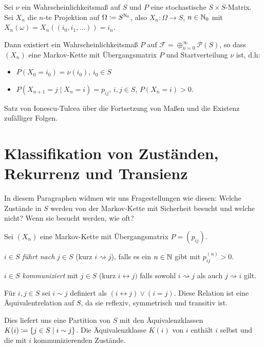\documentclass[a4paper,twoside,DIV15,BCOR12mm]{scrbook}
\newcommand{\cF}{\mathcal F}
\begin{document}
\begin{satz}
Sei $\nu$ ein Wahrscheinlichkeitsmaß auf $S$ und $P$ eine stochastische $S\times S$-Matrix. Sei $X_n$ die $n$-te Projektion auf $\Omega \da S^{\MdN_0}$, also $X_n : \Omega\to S$, $n\in\mathbb{N}_0$ mit $X_n(\omega) = X_n( (i_0,i_1,\ldots) ) = i_n$.

Dann existiert ein Wahrscheinlichkeitsmaß $P$ auf $\cF = \oplus_{n=0}^\infty \mathcal P (S)$, so dass $(X_n)$ eine Markov-Kette mit Übergangsmatrix $P$ und Startverteilung $\nu$ ist, d.h:
\begin{itemize}
\item $P(X_0 = i_0)= \nu(i_0)$, $i_0\in S$
\item $P(X_{n+1} = j \mid X_n= i) = p_{ij}$, $i,j\in S$, $P(X_n=i)>0$.
\end{itemize}
\end{satz}

\begin{beweis}
Satz von Ionescu-Tulcea über die Fortsetzung von Maßen und die Existenz zufälliger Folgen.
\end{beweis}

\section{Klassifikation von Zuständen, Rekurrenz und Transienz}

In diesem Paragraphen widmen wir uns Fragestellungen wie diesen:
Welche Zustände in $S$ werden von der Markov-Kette mit Sicherheit besucht und welche nicht? Wenn sie besucht werden, wie oft? 

\begin{definition}
Sei $(X_n)$ eine Markov-Kette mit Übergangsmatrix $P=(p_{ij})$.
\begin{enuma}
\item $i\in S$ \emph{führt nach} $j\in S$ (kurz $i\rightsquigarrow j$)\index{$\rightsquigarrow$}, falls es ein $n\in \mathbb{N}$ gibt mit $p_{ij}^{(n)}>0$.

\item $i\in S$ \emph{kommuniziert} mit $j\in S$ (kurz $i\leftrightarrow j)$\index{$\leftrightarrow$} falls sowohl $i\rightsquigarrow j$ als auch $j\rightsquigarrow i$ gilt.
\end{enuma}
\end{definition}

\begin{bemerkung}
Für $i,j\in S$ sei $i\sim j$ definiert als $(i\leftrightarrow j) \vee (i=j)$. Diese Relation ist eine Äquivalentrelation auf $S$, da sie reflexiv, symmetrisch und transitiv ist.

Dies liefert uns eine Partition von $S$ mit den Äquivalenzklassen $K(i) \da \{j\in S \mid i\sim j\}$. Die Äquivalenzklasse $K(i)$ von $i$ enthält $i$ selbst und die mit $i$ kommunizierenden Zustände.
\end{bemerkung}
\end{document}
